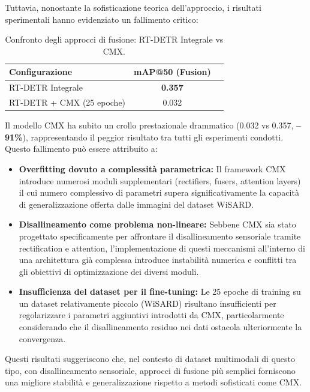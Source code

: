 \documentclass[a4paper,12pt]{article}
\begin{document}
Tuttavia, nonostante la sofisticazione teorica dell'approccio, i risultati sperimentali hanno evidenziato un fallimento critico:

\begin{table}[H]
\centering
\caption{Confronto degli approcci di fusione: RT-DETR Integrale vs CMX.}
\label{tab:rtdetr_cmx_comparison}
\begin{tabular}{lcc}
\toprule
\textbf{Configurazione} & \textbf{mAP@50 (Fusion)} \\
\midrule
RT-DETR Integrale & \textbf{0.357} \\
RT-DETR + CMX (25 epoche) & 0.032 \\
\bottomrule
\end{tabular}
\end{table}

Il modello CMX ha subito un crollo prestazionale drammatico (0.032 vs 0.357, \textbf{--91\%}), rappresentando il peggior risultato tra tutti gli esperimenti condotti. Questo fallimento può essere attribuito a:
\begin{itemize}
    \item \textbf{Overfitting dovuto a complessità parametrica:} Il framework CMX introduce numerosi moduli supplementari (rectifiers, fusers, attention layers) il cui numero complessivo di parametri supera significativamente la capacità di generalizzazione offerta dalle immagini del dataset WiSARD.
    \item \textbf{Disallineamento come problema non-lineare:} Sebbene CMX sia stato progettato specificamente per affrontare il disallineamento sensoriale tramite rectification e attention, l'implementazione di questi meccanismi all'interno di una architettura già complessa introduce instabilità numerica e conflitti tra gli obiettivi di optimizzazione dei diversi moduli.
    \item \textbf{Insufficienza del dataset per il fine-tuning:} Le 25 epoche di training su un dataset relativamente piccolo (WiSARD) risultano insufficienti per regolarizzare i parametri aggiuntivi introdotti da CMX, particolarmente considerando che il disallineamento residuo nei dati ostacola ulteriormente la convergenza.
\end{itemize}

Questi risultati suggeriscono che, nel contesto di dataset multimodali di questo tipo, con disallineamento sensoriale, approcci di fusione più semplici forniscono una migliore stabilità e generalizzazione rispetto a metodi sofisticati come CMX.
\end{document}
